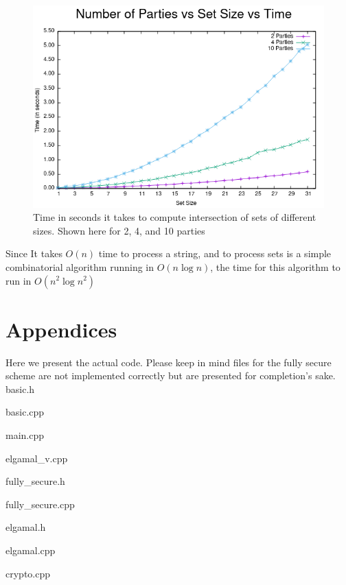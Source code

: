 \documentclass[10pt]{article}
\begin{document}
\begin{figure}[ht!]
\centering
\includegraphics[scale=0.64]{g6} 
\caption{Time in seconds it takes to compute intersection of sets of different sizes. Shown here for 2, 4, and 10 parties}
\end{figure}

Since It takes $O(n)$ time to process a string, and to process sets is a simple combinatorial algorithm running in $O(n\log n)$, the time for this algorithm to run in $O(n^2 \log n^2)$




\section{Appendices}
Here we present the actual code. Please keep in mind files for the fully secure scheme are not implemented correctly but are presented for completion's sake.\\
basic.h

basic.cpp

main.cpp

elgamal\_v.cpp

fully\_secure.h

fully\_secure.cpp

elgamal.h

elgamal.cpp

crypto.cpp




%
\begin{thebibliography}{1}





\end{thebibliography}
\end{document}
